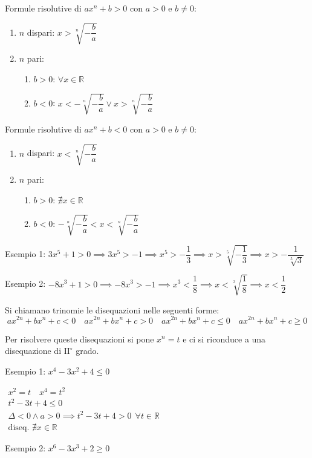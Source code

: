 \documentclass[a4paper]{article}
\theoremstyle{plain}
\theoremstyle{definition}
\theoremstyle{remark}
\newcommand{\R}{\mathbb{R}}
\begin{document}
Formule risolutive di $ax^n+b>0$ con $a>0$ e $b\ne0$:
\begin{enumerate}
    \item $n$ dispari: $x>\sqrt[n]{-\dfrac{b}{a}}$
    \item $n$ pari:
    \begin{enumerate}
        \item $b>0$: $\forall x\in\R$
        \item $b<0$: $x<-\sqrt[n]{-\dfrac{b}{a}}\lor x>\sqrt[n]{-\dfrac{b}{a}}$
    \end{enumerate}
\end{enumerate}
Formule risolutive di $ax^n+b<0$ con $a>0$ e $b\ne0$:
\begin{enumerate}
    \item $n$ dispari: $x<\sqrt[n]{-\dfrac{b}{a}}$
    \item $n$ pari:
    \begin{enumerate}
        \item $b>0$: $\nexists x\in\R$
        \item $b<0$: $-\sqrt[n]{-\dfrac{b}{a}}<x<\sqrt[n]{-\dfrac{b}{a}}$
    \end{enumerate}
\end{enumerate}
Esempio 1: $3x^5+1>0\implies 3x^5>-1\implies x^5>-\dfrac{1}{3}\implies x>\sqrt[5]{-\dfrac{1}{3}}\implies x>-\dfrac{1}{\sqrt[5]{3}}$

Esempio 2: $-8x^3+1>0\implies -8x^3>-1\implies x^3<\dfrac{1}{8}\implies x<\sqrt[3]{\dfrac{1}{8}}\implies x<\dfrac{1}{2}$

Si chiamano trinomie le disequazioni nelle seguenti forme:
\begin{equation}
    ax^{2n}+bx^n+c<0\quad ax^{2n}+bx^n+c>0\quad ax^{2n}+bx^n+c\leq0\quad ax^{2n}+bx^n+c\geq0
\end{equation}

Per risolvere queste disequazioni si pone $x^n=t$ e ci si riconduce a una disequazione di $\mathrm{II}^\circ$ grado.

Esempio 1: $x^4-3x^2+4\leq0$

$\begin{array}{l}
   x^2=t\quad x^4=t^2\\
   t^2-3t+4\leq0\\
   \Delta<0\land a>0\implies t^2-3t+4>0\ \ \forall t\in\R\\
   \text{diseq. }\nexists x\in\R
\end{array}$

Esempio 2: $x^6-3x^3+2\geq0$
\end{document}
